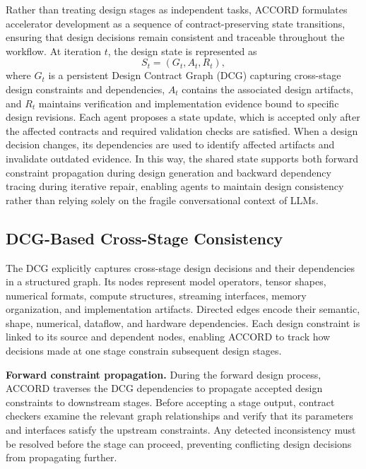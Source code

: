 \documentclass[conference]{IEEEtran}
\begin{document}
Rather than treating design stages as independent tasks, ACCORD formulates accelerator development as a sequence of contract-preserving state transitions, ensuring that design decisions remain consistent and traceable throughout the workflow. At iteration $t$, the design state is represented as
\begin{equation}
S_t = (G_t, A_t, R_t),
\end{equation}
where $G_t$ is a persistent Design Contract Graph (DCG) capturing cross-stage design constraints and dependencies, $A_t$ contains the associated design artifacts, and $R_t$ maintains verification and implementation evidence bound to specific design revisions. Each agent proposes a state update, which is accepted only after the affected contracts and required validation checks are satisfied. When a design decision changes, its dependencies are used to identify affected artifacts and invalidate outdated evidence. In this way, the shared state supports both forward constraint propagation during design generation and backward dependency tracing during iterative repair, enabling agents to maintain design consistency rather than relying solely on the fragile conversational context of LLMs.

\subsection{DCG-Based Cross-Stage Consistency}
The DCG explicitly captures cross-stage design decisions and their dependencies in a structured graph. Its nodes represent model operators, tensor shapes, numerical formats, compute structures, streaming interfaces, memory organization, and implementation artifacts. Directed edges encode their semantic, shape, numerical, dataflow, and hardware dependencies. Each design constraint is linked to its source and dependent nodes, enabling ACCORD to track how decisions made at one stage constrain subsequent design stages.

\noindent\textbf{Forward constraint propagation.}
During the forward design process, ACCORD traverses the DCG dependencies to propagate accepted design constraints to downstream stages. Before accepting a stage output, contract checkers examine the relevant graph relationships and verify that its parameters and interfaces satisfy the upstream constraints. Any detected inconsistency must be resolved before the stage can proceed, preventing conflicting design decisions from propagating further.
\end{document}

